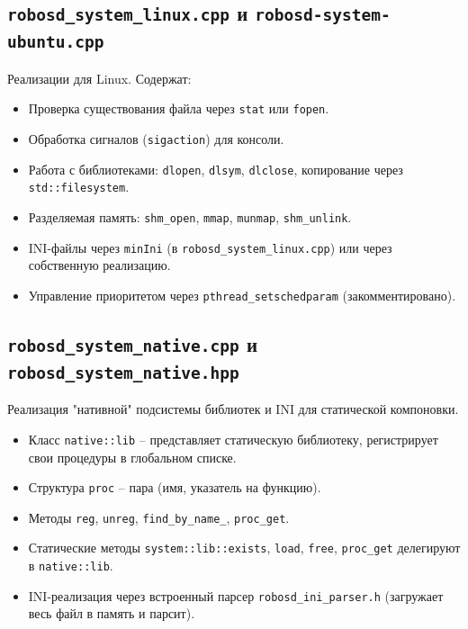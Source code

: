 \documentclass[a4paper,12pt]{article}
\begin{document}
\subsection{\texttt{robosd\_system\_linux.cpp} и \texttt{robosd-system-ubuntu.cpp}}

Реализации для Linux. Содержат:
\begin{itemize}
    \item Проверка существования файла через \texttt{stat} или \texttt{fopen}.
    \item Обработка сигналов (\texttt{sigaction}) для консоли.
    \item Работа с библиотеками: \texttt{dlopen}, \texttt{dlsym}, \texttt{dlclose}, копирование через \texttt{std::filesystem}.
    \item Разделяемая память: \texttt{shm\_open}, \texttt{mmap}, \texttt{munmap}, \texttt{shm\_unlink}.
    \item INI-файлы через \texttt{minIni} (в \texttt{robosd\_system\_linux.cpp}) или через собственную реализацию.
    \item Управление приоритетом через \texttt{pthread\_setschedparam} (закомментировано).
\end{itemize}

\subsection{\texttt{robosd\_system\_native.cpp} и \texttt{robosd\_system\_native.hpp}}

Реализация "нативной" подсистемы библиотек и INI для статической компоновки.

\begin{itemize}
    \item Класс \texttt{native::lib} -- представляет статическую библиотеку, регистрирует свои процедуры в глобальном списке.
    \item Структура \texttt{proc} -- пара (имя, указатель на функцию).
    \item Методы \texttt{reg}, \texttt{unreg}, \texttt{find\_by\_name\_}, \texttt{proc\_get}.
    \item Статические методы \texttt{system::lib::exists}, \texttt{load}, \texttt{free}, \texttt{proc\_get} делегируют в \texttt{native::lib}.
    \item INI-реализация через встроенный парсер \texttt{robosd\_ini\_parser.h} (загружает весь файл в память и парсит).
\end{itemize}
\end{document}
